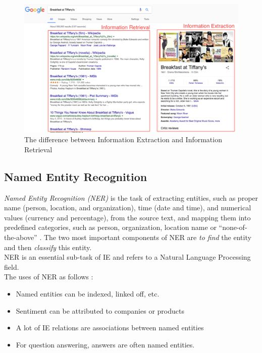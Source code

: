\begin{figure}[h]
\begin{center}
\includegraphics[width=1.0\textwidth]{figures03/retrieval_extraction}
\caption{The difference between Information Extraction and Information Retrieval}
\label{fig:retrieval_extraction}
\end{center}
\end{figure}


\subsection{Named Entity Recognition}
\textit{Named Entity Recognition (NER)} is the task of extracting entities, such as proper name (person, location, and organization), time (date and time), and numerical values (currency and percentage), from the source text, and mapping them into predefined categories, such as person, organization, location name or “none-of-the-above” \cite{MaxEntropy}. The two most important components of NER are \textit{to find} the entity and then \textit{classify} this entity. \\

NER is an essential sub-task of IE and refers to a Natural Language Processing field. \\

The uses of NER as follows \cite{ManLect}:
\begin{itemize}
    \item Named entities can be indexed, linked off, etc.
    \item Sentiment can be attributed to companies or products
    \item A lot of IE relations are associations between named entities
    \item For question answering, answers are often named entities.
\end{itemize}


